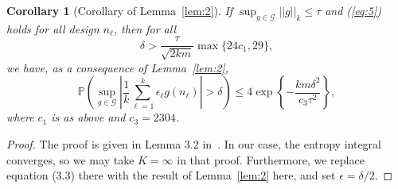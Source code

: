 \documentclass[11pt]{article}
\newtheorem{corollary}[theorem]{Corollary}
\renewcommand{\P}{\mathbb{P}}
\renewcommand{\eqref}[1]{(\ref{eq:#1})}
\newcommand{\vnorm}[1]{\left|\left| #1 \right|\right|}
\begin{document}
\begin{corollary}
  [Corollary of Lemma~\ref{lem:2}]
  \label{cor}
  If $\sup_{g \in \mathcal{G}} \vnorm{g}_k \leq \tau$ and \eqref{5}
  holds for all design $n_\ell$, then for all
  \begin{equation*}
    \label{eq:15}
    \delta>\frac{\tau}{\sqrt{2km}} \max\{24c_1, 29\},
  \end{equation*}
  we have, as a consequence of Lemma~\ref{lem:2},
  \begin{equation*}
    \label{eq:16}
    \P\left( \sup_{g \in \mathcal{G}} \left|\frac{1}{k} \sum_{\ell=1}^k
        \epsilon_\ell g(n_\ell)\right| > \delta \right) \leq 4
    \exp\left\{- \frac{km\delta^2}{c_3\tau^2}\right\},
  \end{equation*}
  where $c_1$ is as above and $c_3=2304$.
\end{corollary}
\begin{proof}
  The proof is given in Lemma 3.2 in~\citet{Geer2000}. In our case, the entropy
  integral converges, so we may take $K=\infty$ in that proof. Furthermore, we
  replace equation (3.3) there with the result of Lemma~\ref{lem:2} here, and
  set $\epsilon=\delta/2$.
\end{proof}
\end{document}
